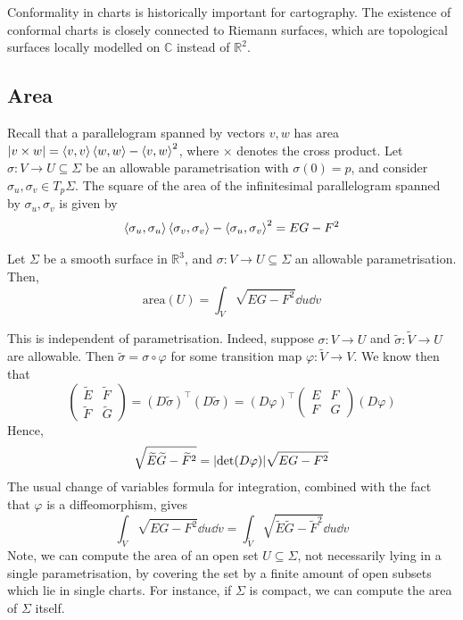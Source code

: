 \documentclass[a4paper]{article}
\begin{document}
\begin{remark}
	Conformality in charts is historically important for cartography.
	The existence of conformal charts is closely connected to Riemann surfaces, which are topological surfaces locally modelled on \( \mathbb C \) instead of \( \mathbb R^2 \).
\end{remark}

\subsection{Area}
Recall that a parallelogram spanned by vectors \( v, w \) has area \( \abs{v \times w} = \left\langle{v,v}\right\rangle\left\langle{w,w}\right\rangle - \left\langle{v,w}\right\rangle^2 \), where \( \times \) denotes the cross product.
Let \( \sigma \colon V \to U \subseteq \Sigma \) be an allowable parametrisation with \( \sigma(0) = p \), and consider \( \sigma_u, \sigma_v \in T_p \Sigma \).
The square of the area of the infinitesimal parallelogram spanned by \( \sigma_u, \sigma_v \) is given by
\[
	\left\langle{\sigma_u, \sigma_u}\right\rangle\left\langle{\sigma_v, \sigma_v}\right\rangle - \left\langle{\sigma_u, \sigma_v}\right\rangle^2 = EG - F^2
\]
\begin{definition}
	Let \( \Sigma \) be a smooth surface in \( \mathbb R^3 \), and \( \sigma \colon V \to U \subseteq \Sigma \) an allowable parametrisation.
	Then,
	\[
		\mathrm{area}(U) = \int_V \sqrt{EG - F^2} \dd{u}\dd{v}
	\]
\end{definition}
\begin{note}
	This is independent of parametrisation.
	Indeed, suppose \( \sigma \colon V \to U \) and \( \widetilde \sigma \colon \widetilde V \to U \) are allowable.
	Then \( \widetilde \sigma = \sigma \circ \varphi \) for some transition map \( \varphi \colon \widetilde V \to V \).
	We know then that
	\[
		\begin{pmatrix}
			\widetilde E & \widetilde F \\
			\widetilde F & \widetilde G
		\end{pmatrix} = (D\widetilde \sigma)^\top (D\widetilde \sigma) = (D\varphi)^\top \begin{pmatrix}
			E & F \\
			F & G
		\end{pmatrix} (D\varphi)
	\]
	Hence,
	\[
		\sqrt{\widetilde E \widetilde G - \widetilde F^2} = \abs{\det(D\varphi)} \sqrt{EG - F^2}
	\]
	The usual change of variables formula for integration, combined with the fact that \( \varphi \) is a diffeomorphism, gives
	\[
		\int_V \sqrt{EG - F^2} \dd{u}\dd{v} = \int_{\widetilde V} \sqrt{\widetilde E \widetilde G - \widetilde F^2} \dd{u}\dd{v}
	\]
	Note, we can compute the area of an open set \( U \subseteq \Sigma \), not necessarily lying in a single parametrisation, by covering the set by a finite amount of open subsets which lie in single charts.
	For instance, if \( \Sigma \) is compact, we can compute the area of \( \Sigma \) itself.
\end{note}
\end{document}
